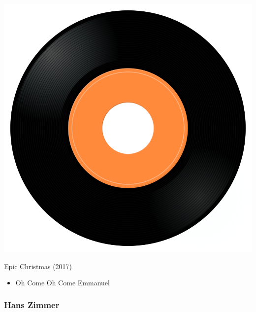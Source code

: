 \begin{minipage}[t]{0.25\textwidth}\vspace{0pt}
\captionsetup{type=figure}
\includegraphics[width=\textwidth]{Images/cover.png}
\caption*{Epic Christmas (2017)}
\end{minipage}
\begin{minipage}[t]{0.25\textwidth}\vspace{0pt}
\begin{itemize}[nosep,leftmargin=1em,labelwidth=*,align=left]
	\setlength{\itemsep}{0pt}
	\item Oh Come Oh Come Emmanuel
\end{itemize}
\end{minipage}

\subsubsection{Hans Zimmer}

